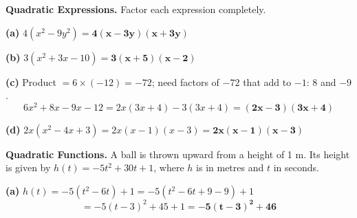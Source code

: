 \documentclass[addpoints]{exam}
\begin{document}
\begin{questions}
\question[8] \textbf{Quadratic Expressions.} Factor each expression completely.
\begin{solution}[8cm]
\textbf{(a)} $4(x^2 - 9y^2) = \mathbf{4(x-3y)(x+3y)}$

\textbf{(b)} $3(x^2 + 3x - 10) = \mathbf{3(x+5)(x-2)}$

\textbf{(c)} Product $= 6 \times (-12) = -72$; need factors of $-72$ that add to $-1$: $8$ and $-9$.
\[6x^2 + 8x - 9x - 12 = 2x(3x+4) - 3(3x+4) = \mathbf{(2x-3)(3x+4)}\]

\textbf{(d)} $2x(x^2 - 4x + 3) = 2x(x-1)(x-3) = \mathbf{2x(x-1)(x-3)}$
\end{solution}

\question[8] \textbf{Quadratic Functions.} A ball is thrown upward from a height of 1 m.
Its height is given by $h(t) = -5t^2 + 30t + 1$, where $h$ is in metres and $t$ in seconds.
\begin{solution}[10cm]
\textbf{(a)} $h(t) = -5(t^2 - 6t) + 1 = -5(t^2 - 6t + 9 - 9) + 1$
\[= -5(t-3)^2 + 45 + 1 = \mathbf{-5(t-3)^2 + 46}\]


\end{solution}
\end{questions}
\end{document}
